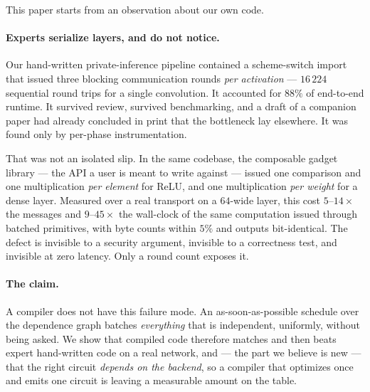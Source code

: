 \documentclass[11pt]{article}
\begin{document}
This paper starts from an observation about our own code.

\paragraph{Experts serialize layers, and do not notice.} Our hand-written
private-inference pipeline contained a scheme-switch import that issued three
blocking communication rounds \emph{per activation} --- $16\,224$ sequential
round trips for a single convolution. It accounted for $88\%$ of end-to-end
runtime. It survived review, survived benchmarking, and a draft of a
companion paper had already concluded in print that the bottleneck lay
elsewhere. It was found only by per-phase instrumentation.

That was not an isolated slip. In the same codebase, the composable gadget
library --- the API a user is meant to write against --- issued one comparison
and one multiplication \emph{per element} for ReLU, and one multiplication
\emph{per weight} for a dense layer. Measured over a real transport on a
$64$-wide layer, this cost $5$--$14\times$ the messages and $9$--$45\times$
the wall-clock of the same computation issued through batched primitives, with
byte counts within $5\%$ and outputs bit-identical. The defect is invisible to
a security argument, invisible to a correctness test, and invisible at zero
latency. Only a round count exposes it.

\paragraph{The claim.} A compiler does not have this failure mode. An
as-soon-as-possible schedule over the dependence graph batches
\emph{everything} that is independent, uniformly, without being asked. We show
that compiled code therefore matches and then beats expert hand-written code
on a real network, and --- the part we believe is new --- that the right
circuit \emph{depends on the backend}, so a compiler that optimizes once and
emits one circuit is leaving a measurable amount on the table.
\end{document}
